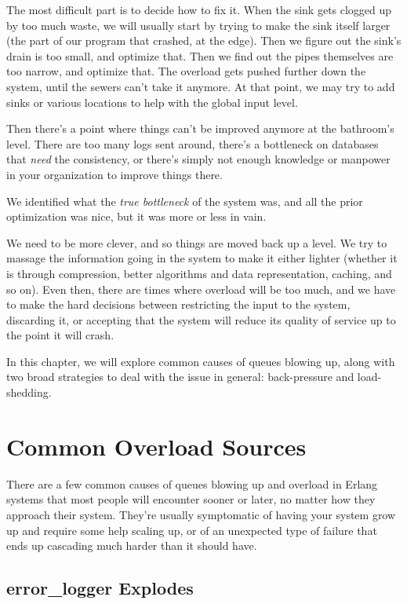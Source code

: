 \documentclass[11pt, oneside]{book}   	%
\begin{document}
The most difficult part is to decide how to fix it. When the sink gets clogged up by too much waste, we will usually start by trying to make the sink itself larger (the part of our program that crashed, at the edge). Then we figure out the sink's drain is too small, and optimize that. Then we find out the pipes themselves are too narrow, and optimize that. The overload gets pushed further down the system, until the sewers can't take it anymore. At that point, we may try to add sinks or various locations to help with the global input level.

Then there's a point where things can't be improved anymore at the bathroom's level. There are too many logs sent around, there's a bottleneck on databases that \emph{need} the consistency, or there's simply not enough knowledge or manpower in your organization to improve things there.

\FloatBarrier

We identified what the \emph{true bottleneck} of the system was, and all the prior optimization was nice, but it was more or less in vain.

We need to be more clever, and so things are moved back up a level. We try to massage the information going in the system to make it either lighter (whether it is through compression, better algorithms and data representation, caching, and so on). Even then, there are times where overload will be too much, and we have to make the hard decisions between restricting the input to the system, discarding it, or accepting that the system will reduce its quality of service up to the point it will crash.

In this chapter, we will explore common causes of queues blowing up, along with two broad strategies to deal with the issue in general: back-pressure and load-shedding.

\section{Common Overload Sources}

There are a few common causes of queues blowing up and overload in Erlang systems that most people will encounter sooner or later, no matter how they approach their system. They're usually symptomatic of having your system grow up and require some help scaling up, or of an unexpected type of failure that ends up cascading much harder than it should have.

\subsection{error\_logger Explodes}
\end{document}
